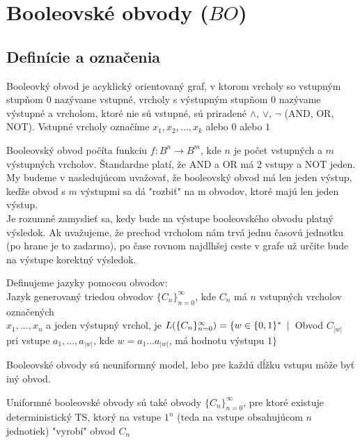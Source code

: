 \chapter{Booleovské obvody ($BO$)}

\section{Definície a označenia}

\begin{definicia}
  Booleovký obvod je acyklický orientovaný graf,
  v ktorom vrcholy so vstupným stupňom 0 nazývame vstupné,
  vrcholy s výstupným stupňom 0 nazývame výstupné a vrcholom,
  ktoré nie sú vstupné, sú priradené $\wedge$, $\vee$, $\neg$ (AND, OR, NOT).
  Vstupné vrcholy označíme $x_1, x_2, ..., x_k$ alebo $0$ alebo $1$
\end{definicia}

Booleovský obvod počíta funkciu $f: B^n \rightarrow B^m$,
kde $n$ je počet vstupných a $m$ výstupných vrcholov.
Štandardne platí, že AND a OR má 2 vstupy a NOT jeden.
My budeme v nasledujúcom uvažovať, že booleovský obvod má len jeden výstup,
keďže obvod s $m$ výstupmi sa dá "rozbiť" na m obvodov,
ktoré majú len jeden výstup.\\
Je rozumné zamyslieť sa, kedy bude na výstupe booleovského obvodu
platný výsledok. Ak uvažujeme, že prechod vrcholom nám trvá
jednu časovú jednotku (po hrane je to zadarmo), po čase rovnom
najdlhšej ceste v grafe už určite bude na výstupe korektný výsledok.

\begin{definicia}
  Definujeme jazyky pomocou obvodov:\\
  Jazyk generovaný triedou obvodov
  $\{C_n\}_{n=0}^{\infty}$, kde $C_n$ má $n$ vstupných vrcholov označených\\
  $x_1,...,x_n$ a jeden výstupný vrchol,
  je $L(\{C_n\}_{n=0}^{\infty})=\{w \in \{0,1\}^* \enspace |\enspace $Obvod
  $C_{|w|}$ pri vstupe $a_1,...,a_{|w|}$, kde $w=a_1...a_{|w|}$, má hodnotu výstupu $1\}$
\end{definicia}

Booleovské obvody sú neuniformný model,
lebo pre každú dĺžku vstupu môže byť iný obvod.

\begin{definicia}
  Uniformné booleovské obvody sú také obvody $\{C_n\}_{n=0}^{\infty}$,
  pre ktoré existuje deterministický TS, ktorý na vstupe $1^n$
  (teda na vstupe obsahujúcom $n$ jednotiek)
  "vyrobí" obvod $C_n$
\end{definicia}

